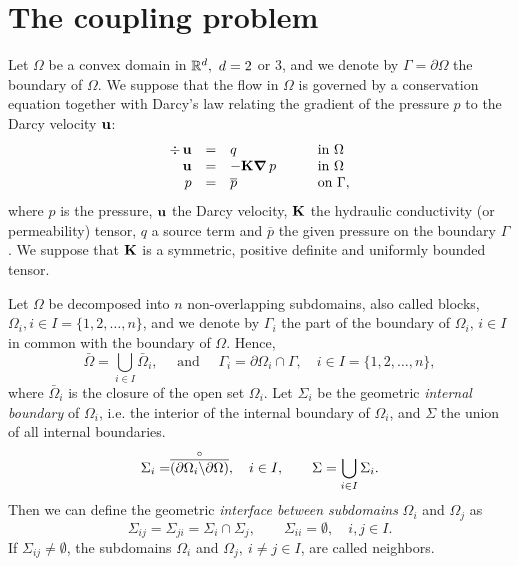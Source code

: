 \section{The coupling problem}
%

Let $\Omega$ be a convex domain in ${\mathbb R}^d,\,\, d=2$ or $3$, and we denote by
$\Gamma=\partial \Omega$ the boundary of $\Omega$. We suppose that the flow in
$\Omega$ is governed by a conservation equation together with Darcy's law
relating the gradient of the pressure $p$ to the Darcy velocity ${\bf u}$:
\begin{equation}\label{prob}\begin{array}{rllll}
\div\,{\bf u} &=& q &\qquad\mbox{in }\Omega\\
{\bf u} &=& -{\bf K }\mbox{\boldmath $\nabla$}\,p   &\qquad\mbox{in }\Omega\\
p&=&\overline{p}&\qquad\mbox{on }\Gamma,
\end{array}\end{equation}
where $p$ is the pressure, 
      ${\bf u}$ the Darcy velocity, 
      ${\bf K}$ the hydraulic conductivity (or permeability) tensor,
      $q$ a source term and
      $\overline{p}$ the given pressure on the boundary $\Gamma$.
We suppose that ${\bf K}$ is a symmetric, positive definite and uniformly
bounded tensor.

Let $\Omega$ be decomposed into $n$ non-overlapping subdomains, also called
blocks, $\Omega_i, i\in I=\{1,2,\ldots,n\}$, and we denote by $\Gamma_{i}$ the
part of the boundary of $\Omega_{i},\, i \in I$ in common with the boundary of
$\Omega$. Hence,
\[
\bar\Omega = \bigcup_{i\in I} \bar\Omega_i, 
\quad \mbox{ and } \quad 
\Gamma_{i} = \partial\Omega_{i}\cap\Gamma,\quad i \in I = \{1,2,\ldots,n\},
\]
where $\bar\Omega_i$ is the closure of the open set $\Omega_i$.
Let $\Sigma_{i}$ be the geometric {\it internal boundary} of $\Omega_i$, i.e.
the interior of the internal boundary of $\Omega_i$, and $\Sigma$ the union of
all internal boundaries.
\[
\Sigma_{i} = \stackrel{\circ}{\overline{(\partial \Omega_i \backslash \partial \Omega)}},\quad i
\in I, \qquad \Sigma = \bigcup_{i \in I} \Sigma_{i}.
\]
Then we can define the geometric {\it interface between subdomains} $\Omega_i$ and $\Omega_j$ as 
\[
\Sigma_{ij} = \Sigma_{ji} = \Sigma_{i} \cap  \Sigma_{j}, \qquad \Sigma_{ii} = \emptyset,
\quad i, j \in I.
\]
If $\Sigma_{ij} \neq \emptyset$, the subdomains $\Omega_i$ and $\Omega_j, \ 
i \neq j \in I$, are called neighbors. 


